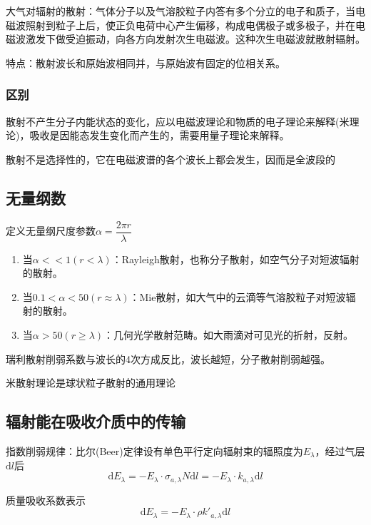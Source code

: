 \documentclass[UTF8,a4paper,11pt,oneside]{ctexbook}
\begin{document}
大气对辐射的散射：气体分子以及气溶胶粒子内答有多个分立的电子和质子，当电磁波照射到粒子上后，使正负电荷中心产生偏移，构成电偶极子或多极子，并在电磁波激发下做受迫振动，向各方向发射次生电磁波。这种次生电磁波就散射辐射。

特点：散射波长和原始波相同并，与原始波有固定的位相关系。

\subsubsection{区别}

散射不产生分子内能状态的变化，应以电磁波理论和物质的电子理论来解释(米理论)，吸收是因能态发生变化而产生的，需要用量子理论来解释。

散射不是选择性的，它在电磁波谱的各个波长上都会发生，因而是全波段的

\subsection{无量纲数}

定义无量纲尺度参数\(\alpha=\dfrac{2\pi{}r}{\lambda}\)
\begin{enumerate}
    \item 当\(\alpha<<1(r<\lambda)\)：Rayleigh散射，也称分子散射，如空气分子对短波辐射的散射。
    \item 当\(0.1<\alpha<50(r\approx\lambda)\)：Mie散射，如大气中的云滴等气溶胶粒子对短波辐射的散射。
    \item 当\(\alpha>50(r\geq\lambda)\)：几何光学散射范畴。如大雨滴对可见光的折射，反射。
\end{enumerate}

瑞利散射削弱系数与波长的4次方成反比，波长越短，分子散射削弱越强。

米散射理论是球状粒子散射的通用理论

\subsection{辐射能在吸收介质中的传输}

指数削弱规律：比尔(Beer)定律设有单色平行定向辐射束的辐照度为\(E_\lambda\)，经过气层\(\mathrm{d}l\)后
\begin{equation}
\mathrm{d}E_\lambda=-E_\lambda\cdot\sigma_{a,\lambda}N\mathrm{d}l=-E_\lambda\cdot{}k_{a,\lambda}\mathrm{d}l
\end{equation}

质量吸收系数表示
\begin{equation}
\mathrm{d}E_\lambda=-E_\lambda\cdot\rho{}k'_{a,\lambda}\mathrm{d}l
\end{equation}
\end{document}
